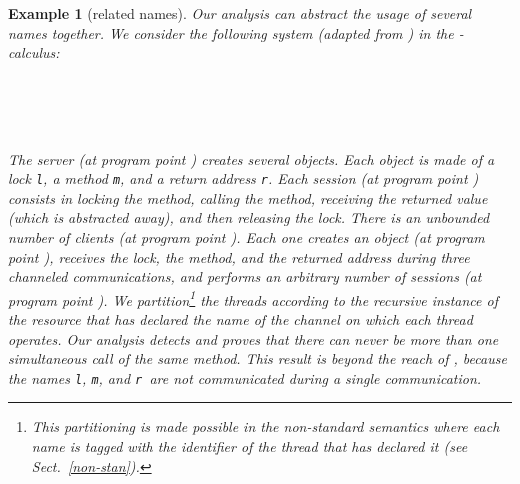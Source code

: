 \documentclass{article}
\newcommand{\boxexample}{}
\newtheorem{example}[thm]{Example}
\newcommand{\picalcul}{-calculus}
\newcommand{\pp}[1]{}
\newcommand{\pps}[1]{(at program point \pp{#1})}
\newcommand{\internal}[1]{\textnormal{\texttt{#1}}}
\newcommand{\clock}{\internal{l}}
\newcommand{\cm}{\internal{m}}
\newcommand{\crr}{\internal{r}}
\newcommand{\twolaba}{1}
\newcommand{\twolabi}{9}
\newcommand{\twolabj}{10}
\newcommand{\twolabn}{14}
\newcommand{\twolabo}{15}
\begin{document}
{
\begin{example}[related names]
Our analysis can  abstract the usage of several names together. We consider the following system (adapted from \cite{igarashi.kobayashi:generic-type}) in the \picalcul:
\label{twonames}
\begin{tabbing}

\=\\
\hspace*{1cm}\\
\\
\hspace*{1cm}
\end{tabbing}
The server \pps{\twolaba} creates several objects. Each object is made of a lock \clock, a method \cm, and a return address \crr. 
Each session \pps{\twolabo} consists in locking the method, calling the method, receiving the returned value (which is abstracted away),  
and then releasing the lock. 
There is an unbounded number of clients \pps{\twolabi}. 
Each one creates an object \pps{\twolabj}, 
receives the lock, the method, and the returned address during three channeled communications, and performs an arbitrary number of sessions \pps{\twolabn}. 
We partition\footnote{This partitioning is made possible in the non-standard semantics where each name is tagged with the identifier of the thread that has declared it (see Sect.~{\ref{non-stan}}).}
 the threads according to the recursive instance of the resource that has declared the name of the channel on which each thread operates.
Our analysis detects and proves that there can never be more than one simultaneous call of the same method.  This result is beyond the reach of \cite{igarashi.kobayashi:generic-type}, because the names \clock, \cm, and \crr\  are not communicated during a single communication.
\boxexample
\end{example}}
\end{document}
